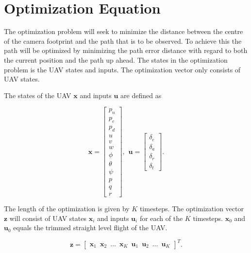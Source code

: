 \section*{Optimization Equation}

The optimization problem will seek to minimize the distance between the centre of the camera footprint and the path that is to be observed. To achieve this the path will be optimized by minimizing the path error distance with regard to both the current position and the path up ahead. The states in the optimization problem is the UAV states and inputs. The optimization vector only consists of UAV states.

The states of the UAV $\mathbf{x}$ and inputs $\mathbf{u}$ are defined as

\begin{equation}
	\mathbf{x} = 
	\begin{bmatrix}
		p_n 	\\ p_e		\\ p_d	\\
		u 		\\ v   		\\ w 	\\ 
		\phi	\\ \theta	\\ \psi	\\
		p		\\ q		\\ r
	\end{bmatrix}, \hspace{5pt}
	\mathbf{u} = 
	\begin{bmatrix}
		\delta_e \\ \delta_a	\\ \delta_r	\\ \delta_t
	\end{bmatrix}.
\end{equation}

The length of the optimization is given by $K$ timesteps. The optimization vector $\mathbf{z}$ will consist of UAV states $\mathbf{x}_i$ and inputs $\mathbf{u}_i$ for each of the $K$ timesteps. $\mathbf{x}_0$ and $\mathbf{u}_0$ equals the trimmed straight level flight of the UAV.

\begin{equation}
	\mathbf{z} =
	\begin{bmatrix}
		\mathbf{x}_1 \hspace{6pt} \mathbf{x}_2 \hspace{6pt} \hdots \hspace{6pt} \mathbf{x}_K \hspace{6pt} \mathbf{u}_1 \hspace{6pt} \mathbf{u}_2 \hspace{6pt} \hdots \hspace{6pt} \mathbf{u}_K
	\end{bmatrix}^T.
\end{equation}


